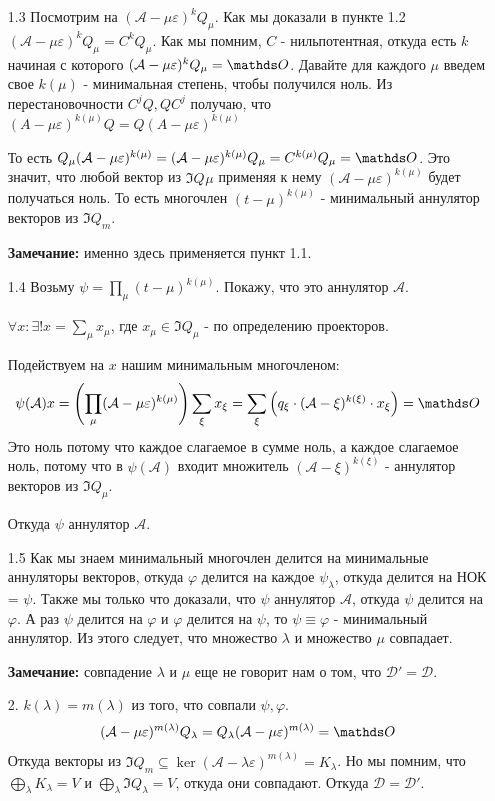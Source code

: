 \begin{enumerate}
    \item[1.3] Посмотрим на $(\mathcal{A}-\mu \varepsilon)^k Q_{\mu}$. Как мы доказали в пункте 1.2 $(\mathcal{A}-\mu \varepsilon)^k Q_{\mu}= C^{k}Q_{\mu}$. Как мы помним, $C$ - нильпотентная, откуда есть $k$ начиная с которого  $(\mathcal{A}-\mu \varepsilon)^k Q_{\mu} = \zero$. Давайте для каждого $\mu$ введем свое $k(\mu)$ - минимальная степень, чтобы получился ноль. Из перестановочности $C^jQ, QC^j$ получаю, что $(A-\mu\varepsilon)^{k(\mu)}Q =Q(A-\mu\varepsilon)^{k(\mu)} $

    То есть $Q_{\mu}(\mathcal{A}-\mu \varepsilon)^{k(\mu)} =(\mathcal{A}-\mu \varepsilon)^{k(\mu)}Q_{\mu}=C^{k(\mu)}Q_{\mu}=\zero$. Это значит, что любой вектор из $\Im Q_{}\mu$ применяя к нему $(\mathcal{A}-\mu \varepsilon)^{k(\mu)}$  будет получаться ноль.
    То есть многочлен $(t-\mu)^{k(\mu)}$ - минимальный аннулятор векторов из $\Im Q_m$. 

    \textbf{Замечание:}  именно здесь применяется пункт 1.1.

    \item[1.4] Возьму $\psi = \prod\limits_{\mu}(t-\mu)^{k(\mu)}$. Покажу, что это аннулятор $\mathcal{A}$. 

    $\forall x: \exists!x = \sum\limits_{\mu}x_{\mu} $, где $x_{\mu} \in \Im Q_{\mu}$ - по определению проекторов.

    Подействуем на $x$ нашим минимальным многочленом:
    $$\psi(\mathcal{A})x = \left( \prod\limits_{\mu}(\mathcal{A}-\mu \varepsilon)^{k(\mu)}\right)\sum\limits_{\xi}x_{\xi} =\sum\limits_{\xi}\left( q_{\xi}\cdot(\mathcal{A}-\xi)^{k(\xi)} \cdot x_{\xi}\right) = \zero $$
    Это ноль потому что каждое слагаемое в сумме ноль, а каждое слагаемое ноль, потому что в $\psi(\mathcal{A})$ входит множитель $(\mathcal{A}-\xi)^{k(\xi)}$ - аннулятор векторов из $\Im Q_\mu$.

    Откуда $\psi$ аннулятор $\mathcal{A}$.
    \item[1.5] Как мы знаем минимальный многочлен делится на минимальные аннуляторы векторов, откуда $\varphi $ делится на каждое $\psi_{\lambda}$, откуда делится на НОК = $\psi$. Также мы только что доказали, что $\psi$ аннулятор $\mathcal{A}$, откуда $\psi$ делится на $\varphi$. А раз  $\psi$ делится на $\varphi$ и $\varphi$ делится на $\psi$, то $\psi \equiv \varphi $ - минимальный аннулятор. Из этого следует, что множество $\lambda$ и множество $\mu$ совпадает.

    \textbf{Замечание:} совпадение  $\lambda$ и $\mu$ еще не говорит нам о том, что $\mathcal{D}' = \mathcal{D}$.
    \item[2.] $k(\lambda) = m(\lambda)$ из того, что совпали $\psi, \varphi$.
    $$(\mathcal{A}-\mu\varepsilon)^{m(\lambda)}Q_{\lambda} =Q_{\lambda}(\mathcal{A}-\mu\varepsilon)^{m(\lambda)} =\zero$$
    Откуда векторы из $\Im Q_{m} \subseteq \ker (\mathcal{A}-\lambda\varepsilon)^{m(\lambda)} = K_{\lambda}$. Но мы помним, что $\bigoplus\limits_{\lambda}K_{\lambda} = V$ и  $\bigoplus\limits_{\lambda}\Im Q_{\lambda} = V$, откуда они совпадают. Откуда $\mathcal{D} = \mathcal{D}'$.
\end{enumerate}


